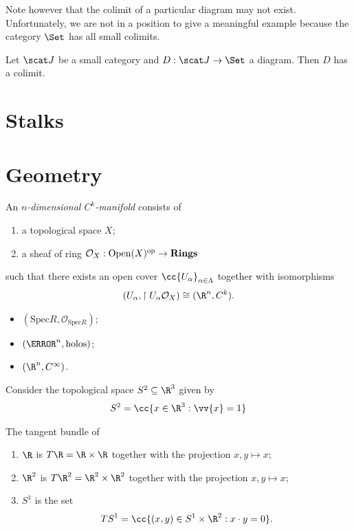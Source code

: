 \documentclass{article}
\begin{document}
Note however that the colimit of a particular diagram may not exist. Unfortunately, we
are not in a position to give a meaningful example because the category $\Set$ has
all small colimits.

\begin{theorem}
  Let $\scat J$ be a small category and $D:\scat J\to\Set$ a diagram. Then $D$ has a colimit.
\end{theorem}
\section{Stalks}

\section{Geometry}

\begin{definition}
  An \emph{$n$-dimensional $C^k$-manifold} consists of
  \begin{enumerate}
    \item a topological space $X$;
    \item a sheaf of ring $\mathcal O_X:\operatorname{Open}(X)^{\text{op}}\to\textbf{Rings}$
  \end{enumerate}
  such that there exists an open cover $\cc{U_\alpha}_{\alpha\in\Lambda}$
  together with isomorphisms
  \begin{align*}
    (U_\alpha,\restriction{U_\alpha}{\mathcal O_X})\cong (\R^n,C^k).
  \end{align*}
\end{definition}

\begin{example}
  \begin{itemize}
    \item $(\text{Spec} R,\mathcal O_{\text{Spec} R})$;
    \item $(\C^n, \text{holos})$;
    \item $(\R^n, C^\infty)$.
  \end{itemize}
\end{example}

\begin{definition}
  Consider the topological space $S^2\subseteq\R^3$ given by
  \begin{align*}
    S^2 = \cc{x \in \R^3 : \vv{x}=1}
  \end{align*}
\end{definition}

\begin{example}
  The tangent bundle of
  \begin{enumerate}
    \item $\R$ is $T\R=\R\times\R$ together with the projection $x,y\mapsto x$;
    \item $\R^2$ is $T\R^2 = \R^2\times\R^2$ together with the projection
      $x,y\mapsto x$;
    \item $S^1$ is the set
      \begin{align*}
        TS^1 = \cc{(x,y)\in S^1\times\R^2: x\cdot y = 0}.
      \end{align*}
  \end{enumerate}
\end{example}
\end{document}
